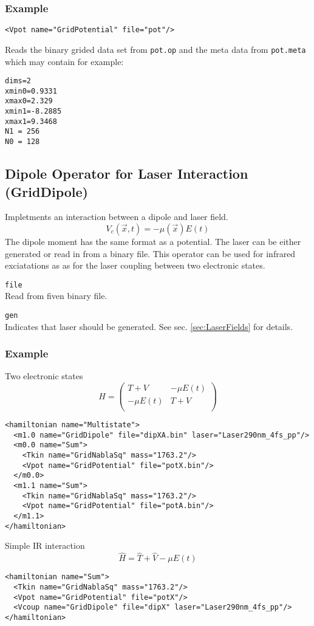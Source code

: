 \documentclass[a4paper,12pt]{scrbook}
\newcommand{\option}[2]{\item \texttt{#1}\\ #2}
\begin{document}
\subsubsection*{Example}
\begin{verbatim}
<Vpot name="GridPotential" file="pot"/>
\end{verbatim}
Reads the binary grided data set from \verb|pot.op| and the meta data from \verb|pot.meta| which may contain for example:
\begin{verbatim}
dims=2
xmin0=0.9331
xmax0=2.329
xmin1=-8.2885
xmax1=9.3468
N1 = 256
N0 = 128
\end{verbatim}

\subsection{Dipole Operator for Laser Interaction (GridDipole)}
Impletments an interaction between a dipole and laser field.
\begin{equation}
 V_c(\vec{x},t) = -\mu(\vec{x}) E(t)
\end{equation}
The dipole moment has the same format as a potential. The laser
can be either generated or read in from a binary file.
This operator can be used for infrared exciatations as as for
the laser coupling between two electronic states.

\begin{options}
 \option{file}{Read from fiven binary file.}
 \option{gen}{Indicates that laser should be generated. See sec. \ref{sec:LaserFields} for details.}
\end{options}


\subsubsection*{Example}
Two electronic states
\begin{equation}
 \hat H = \begin{pmatrix}T + V & -\mu E(t) \\ -\mu E(t) & T + V\\\end{pmatrix}
\end{equation}
\begin{verbatim}
<hamiltonian name="Multistate">
  <m1.0 name="GridDipole" file="dipXA.bin" laser="Laser290nm_4fs_pp"/>
  <m0.0 name="Sum">
    <Tkin name="GridNablaSq" mass="1763.2"/>
    <Vpot name="GridPotential" file="potX.bin"/>
  </m0.0>
  <m1.1 name="Sum">
    <Tkin name="GridNablaSq" mass="1763.2"/>
    <Vpot name="GridPotential" file="potA.bin"/>
  </m1.1>
</hamiltonian>
\end{verbatim}
Simple IR interaction
\begin{equation}
 \hat H = \hat T + \hat V  -\mu E(t)
\end{equation}
\begin{verbatim}
<hamiltonian name="Sum">
  <Tkin name="GridNablaSq" mass="1763.2"/>
  <Vpot name="GridPotential" file="potX"/>
  <Vcoup name="GridDipole" file="dipX" laser="Laser290nm_4fs_pp"/>
</hamiltonian>
\end{verbatim}
\end{document}
